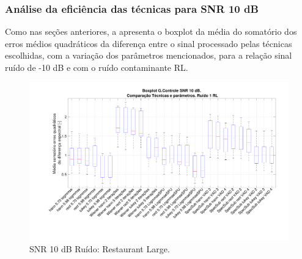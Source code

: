 

\subsubsection{Análise da eficiência das técnicas para SNR 10 dB}


Como nas seções anteriores, a  apresenta o boxplot da média do somatório dos erros médios quadráticos da diferença entre o sinal processado pelas técnicas escolhidas, com a variação dos parâmetros mencionados, para a relação sinal ruído de -10 dB e com o ruído contaminante RL.

\begin{figure}[H]
\centering
\includegraphics[width=16cm]{Figs/Erro_10_Ruido1.pdf}
\caption{SNR 10 dB Ruído: Restaurant Large.}
\label{snr10_1}
\end{figure}

